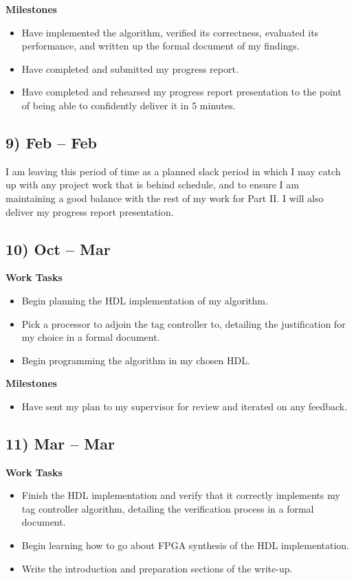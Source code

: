 \documentclass[10pt,a4paper]{article}
\begin{document}
\textbf{Milestones}
\begin{itemize}
	\item Have implemented the algorithm, verified its correctness, evaluated its performance, and written up the formal document of my findings.
	\item Have completed and submitted my progress report.
	\item Have completed and rehearsed my progress report presentation to the point of being able to confidently deliver it in 5 minutes.
\end{itemize}

\subsection*{9)  Feb --  Feb}
I am leaving this period of time as a planned slack period in which I may catch up with any project work that is behind schedule, and to ensure I am maintaining a good balance with the rest of my work for Part II. I will also deliver my progress report presentation.

\subsection*{10)  Oct --  Mar}
\textbf{Work Tasks}
\begin{itemize}
	\item Begin planning the HDL implementation of my algorithm.
	\item Pick a processor to adjoin the tag controller to, detailing the justification for my choice in a formal document.
	\item Begin programming the algorithm in my chosen HDL.
\end{itemize}

\textbf{Milestones}
\begin{itemize}
	\item Have sent my plan to my supervisor for review and iterated on any feedback.
\end{itemize}

\subsection*{11)  Mar --  Mar}
\textbf{Work Tasks}
\begin{itemize}
	\item Finish the HDL implementation and verify that it correctly implements my tag controller algorithm, detailing the verification process in a formal document.
	\item Begin learning how to go about FPGA synthesis of the HDL implementation.
	\item Write the introduction and preparation sections of the write-up.
\end{itemize}
\end{document}

